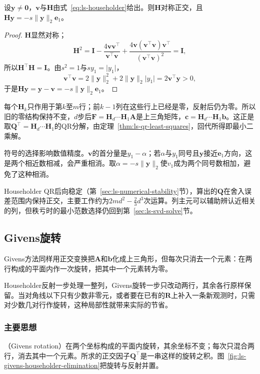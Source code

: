 \begin{lemma}[Householder反射]
\label{lem:ls-householder-reflection}
设$\bm y\neq\bm0$，$\bm v$与$\bm H$由式~\eqref{eq:ls-householder}给出。则$\bm H$对称正交，且$\bm H\bm y=-s\lVert\bm y\rVert_2\bm e_1$。
\end{lemma}
\begin{proof}
$\bm H$显然对称；
\[
 \bm H^2=\bm I-\frac{4\bm v\bm v^\top}{\bm v^\top\bm v}+\frac{4\bm v(\bm v^\top\bm v)\bm v^\top}{(\bm v^\top\bm v)^2}=\bm I ,
\]
所以$\bm H^\top\bm H=\bm I$。由$s^2=1$与$sy_1=\lvert y_1\rvert$，
\[
 \bm v^\top\bm v=2\lVert\bm y\rVert_2^2+2\lVert\bm y\rVert_2\lvert y_1\rvert=2\bm v^\top\bm y>0,
\]
于是$\bm H\bm y=\bm y-\bm v=-s\lVert\bm y\rVert_2\bm e_1$。
\end{proof}

每个$\bm H_k$只作用于第$k$至$m$行；前$k-1$列在这些行上已经是零，反射后仍为零。所以旧的零结构保持不变，$d$步后$\bm F=\bm H_d\cdots\bm H_1\bm A$是上三角矩阵，$\bm c=\bm H_d\cdots\bm H_1\bm b$。这正是取$\bm Q^\top=\bm H_d\cdots\bm H_1$的QR分解，由定理~\ref{thm:ls-qr-least-squares}，回代所得即最小二乘解。

符号的选择影响数值精度。$\bm v$的首分量是$y_1-\alpha$；若$\alpha$与$y_1$同号且$\bm y$接近$\bm e_1$方向，这是两个相近数相减，会严重相消。取$\alpha=-s\lVert\bm y\rVert_2$使$v_1$成为两个同号数相加，避免了这种相消。

Householder QR后向稳定（第~\ref{sec:ls-numerical-stability}节），算出的$\bm Q$在舍入误差范围内保持正交，主要工作约为$2md^2-\tfrac23d^3$次运算。列主元可以辅助辨认近相关的列，但秩亏时的最小范数选择仍回到第~\ref{sec:ls-svd-solve}节。

\subsection{Givens旋转}
\label{sec:ls-givens}

Givens方法同样用正交变换把$\bm A$和$\bm b$化成上三角形，但每次只消去一个元素：在两行构成的平面内作一次旋转，把其中一个元素转为零。

Householder反射一步处理一整列，Givens旋转一步只改动两行，其余各行原样保留。当对角线以下只有少数非零元，或者要在已有的$\bm R$上补入一条新观测时，只需对少数几对行作旋转，这种局部性就带来实际的节省。

\subsubsection{主要思想}
（Givens rotation）在两个坐标构成的平面内旋转，其余坐标不变；每次只混合两行，消去其中一个元素。所求的正交因子$\bm Q^\top$是一串这样的旋转之积。图~\ref{fig:ls-givens-householder-elimination}把旋转与反射并置。

